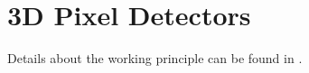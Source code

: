 \section{3D Pixel Detectors}
Details about the working principle can be found in \cite{parker}.

% 



